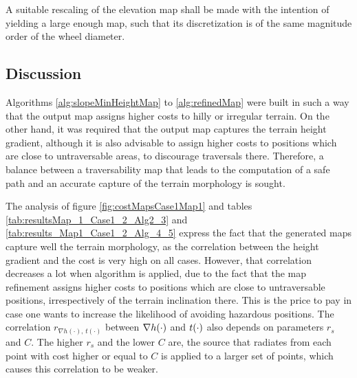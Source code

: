 \begin{remark}
A suitable rescaling of the elevation map shall be made with the intention of yielding a large enough map, such that its discretization is of the same magnitude order of the wheel diameter.
\end{remark}

\subsection{Discussion}
\label{subsection:costMapsDiscussion}

Algorithms \ref{alg:slopeMinHeightMap} to \ref{alg:refinedMap} were built in such a way that the output map assigns higher costs to hilly or irregular terrain. On the other hand, it was required that the output map captures the terrain height gradient, although it is also advisable to assign higher costs to positions which are close to untraversable areas, to discourage traversals there. Therefore, a balance between a traversability map that leads to the computation of a safe path and an accurate capture of the terrain morphology is sought.

The analysis of figure \ref{fig:costMapsCase1Map1} and tables \ref{tab:resultsMap_1_Case1_2_Alg2_3} and \ref{tab:results_Map1_Case1_2_Alg_4_5} express the fact that the generated maps capture well the terrain morphology, as the correlation between the height gradient and the cost is very high on all cases. However, that correlation decreases a lot when algorithm  is applied, due to the fact that the map refinement assigns higher costs to positions which are close to untraversable positions, irrespectively of the terrain inclination there. This is the price to pay in case one wants to increase the likelihood of avoiding hazardous positions. The correlation $r_{\nabla h(\cdot),\,t(\cdot)}$ between $\nabla h(\cdot)$ and $t(\cdot)$ also depends on parameters $r_s$ and $C$. The higher $r_s$ and the lower $C$ are, the source that radiates from each point with cost higher or equal to $C$ is applied to a larger set of points, which causes this correlation to be weaker.

